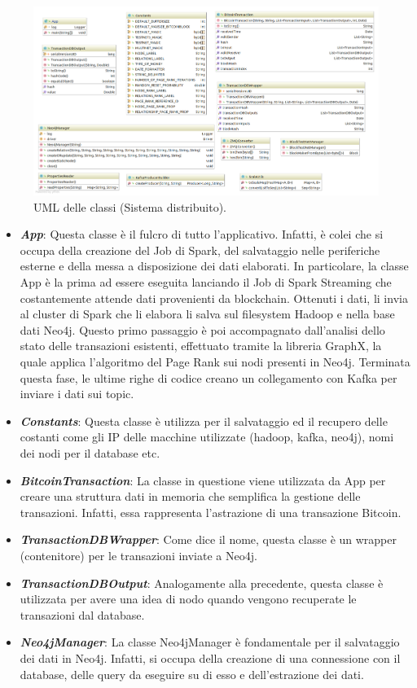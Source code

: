 \begin{figure}[H]
	\centering
	\includegraphics[width=\textwidth, height=0.45\textheight, keepaspectratio]{images/AppUML.png}
	\caption{UML delle classi (Sistema distribuito).}
	\label{fig:UMLSD}
\end{figure}
\begin{itemize}
\item \textbf{\textit{App}}: Questa classe è il fulcro di tutto l'applicativo. Infatti, è colei che si occupa della creazione del Job di Spark, del salvataggio nelle periferiche esterne e della messa a disposizione dei dati elaborati. In particolare, la classe App è la prima ad essere eseguita lanciando il Job di Spark Streaming che costantemente attende dati provenienti da blockchain. Ottenuti i dati, li invia al cluster di Spark che li elabora li salva sul filesystem Hadoop e nella base dati Neo4j. Questo primo passaggio è poi accompagnato dall'analisi dello stato delle transazioni esistenti, effettuato tramite la libreria GraphX, la quale applica l'algoritmo del Page Rank sui nodi presenti in Neo4j. Terminata questa fase, le ultime righe di codice creano un collegamento con Kafka per inviare i dati sui topic. 
\item \textbf{\textit{Constants}}: Questa classe è utilizza per il salvataggio ed il recupero delle costanti come gli IP delle macchine utilizzate (hadoop, kafka, neo4j), nomi dei nodi per il database etc.
\item  \textbf{\textit{BitcoinTransaction}}: La classe in questione viene utilizzata da App per creare una struttura dati in memoria che semplifica la gestione delle transazioni. Infatti, essa rappresenta l'astrazione di una transazione Bitcoin.
\item  \textbf{\textit{TransactionDBWrapper}}: Come dice il nome, questa classe è un wrapper (contenitore) per le transazioni inviate a Neo4j.
\item  \textbf{\textit{TransactionDBOutput}}: Analogamente alla precedente, questa classe è utilizzata per avere una idea di nodo quando vengono recuperate le transazioni dal database.
\item  \textbf{\textit{Neo4jManager}}: La classe Neo4jManager è fondamentale per il salvataggio dei dati in Neo4j. Infatti, si occupa della creazione di una connessione con il database, delle query da eseguire su di esso e dell'estrazione dei dati.
\end{itemize}
